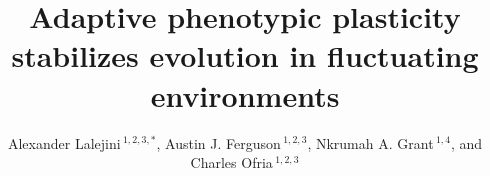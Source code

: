 \documentclass[utf8]{frontiersSCNS} %
\def\firstAuthorLast{Lalejini {et~al.}} %
\def\Authors{Alexander Lalejini\,$^{1,2,3,*}$, Austin J. Ferguson\,$^{1,2,3}$, Nkrumah A. Grant\,$^{1,4}$, and Charles Ofria\,$^{1,2,3}$}
\begin{document}
\onecolumn
{}

\title[Adaptive plasticity stabilizes evolution]{Adaptive phenotypic plasticity stabilizes evolution in fluctuating environments}

\author[\firstAuthorLast ]{\Authors} %
\address{} %
\correspondance{} %

\extraAuth{}%


\maketitle


\newcommand{\code}{\texttt}

\newcommand{\evolutionaryChangeRateReplicates}{100}
\newcommand{\evolutionaryChangeRatePlasticReps}{42}

\newcommand{\novelTraitsReplicates}{100}
\newcommand{\novelTraitsReward}{10\%}
\newcommand{\novelTraitsPlasticReps}{42}

\newcommand{\deleteriousHitchhikingReplicates}{100}
\newcommand{\deleteriousHitchhikingPlasticReps}{43}
\newcommand{\instPoisonMagnitude}{10\%}

\newcommand{\SweepsMetricName}{
Coalescence event count
}
\newcommand{\SweepsMetricDesc}{
Number of coalescence events that have occurred, which indicates the frequency of selective sweeps in the population.
}

\newcommand{\MutationCountMetricName}{
Mutation count
}
\newcommand{\MutationCountMetricDesc}{
Sum of all mutations that have occurred along a lineage.
}
\end{document}
